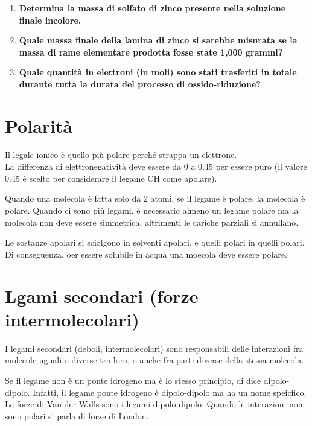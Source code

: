\documentclass[a4paper]{article}
\begin{document}
{\begin{enumerate}
        \item \textbf{Determina la massa di solfato di zinco presente nella soluzione finale incolore.}

        \item \textbf{Quale massa finale della lamina di zinco si sarebbe misurata se la massa di rame
        elementare prodotta fosse state 1,000 grammi?}

        \item \textbf{Quale quantità in elettroni (in moli) sono stati trasferiti in totale
        durante tutta la durata del processo di ossido-riduzione?}
    \end{enumerate}
}

\pagebreak

\section{Polarità}

Il legale ionico è quello più polare perché strappa un elettrone. \\
La differenza di elettronegatività deve essere da 0 a 0.45 per essere puro
(il valore 0.45 è scelto per considerare il legame CH come apolare).

Quando una molecola è fatta solo da 2 atomi, 
se il legame è polare, la molecola è polare.
Quando ci sono più legami, è necessario almeno un legame polare
ma la molecola non deve essere simmetrica, altrimenti le cariche parziali si annullano.

Le sostanze apolari si sciolgono in solventi apolari, e quelli polari in quelli polari.
Di conseguenza, oer essere solubile in acqua una moecola deve essere polare.


\section{Lgami secondari (forze intermolecolari)}


I legami secondari (deboli, intermolecolari) sono responsabili delle interazioni fra molecole uguali o diverse tra loro,
o anche fra parti diverse della stessa molecola.

Se il legame non è un ponte idrogeno ma è lo stesso principio, di dice dipolo-dipolo.
Infatti, il legame ponte idrogeno è dipolo-dipolo ma ha un nome speicfico.
Le forze di Van der Walls sono i legami dipolo-dipolo.
Quando le interazioni non sono polari si parla di forze di London.
\end{document}
